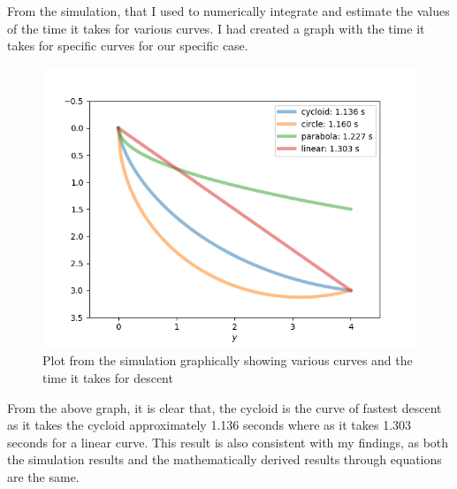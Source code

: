 {From the simulation, that I used to numerically integrate and estimate the values of the time it takes for various curves. I had created a graph with the time it takes for specific curves for our specific case.}

\begin{figure}[H]
\centering
\includegraphics[width=15cm]{BrachDia.png}
    		\caption{{Plot from the simulation graphically showing various curves and the time it takes for descent}}
\end{figure}

{From the above graph, it is clear that, the cycloid is the curve of fastest descent as it takes the cycloid approximately 1.136 seconds where as it takes 1.303 seconds for a linear curve. This result is also consistent with my findings, as both the simulation results and the mathematically derived results through equations are the same.}


